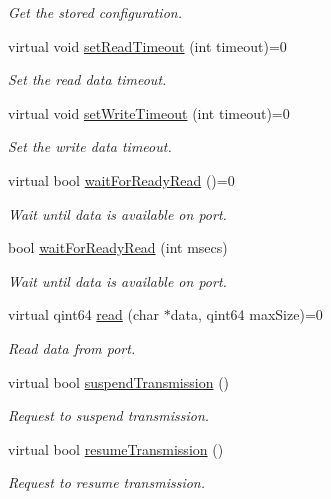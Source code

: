 \begin{DoxyCompactItemize}
\begin{DoxyCompactList}\small\item\em Get the stored configuration. \end{DoxyCompactList}\item 
virtual void \hyperlink{classmdt_abstract_port_a6589b04467e0073d18ba872201bdcd84}{setReadTimeout} (int timeout)=0
\begin{DoxyCompactList}\small\item\em Set the read data timeout. \end{DoxyCompactList}\item 
virtual void \hyperlink{classmdt_abstract_port_a12eb422d52ebb09a650f8497b258c2e7}{setWriteTimeout} (int timeout)=0
\begin{DoxyCompactList}\small\item\em Set the write data timeout. \end{DoxyCompactList}\item 
virtual bool \hyperlink{classmdt_abstract_port_a848e3c86aa6ec480e8c471655fbcf5c5}{waitForReadyRead} ()=0
\begin{DoxyCompactList}\small\item\em Wait until data is available on port. \end{DoxyCompactList}\item 
bool \hyperlink{classmdt_abstract_port_ae77785fbad938eac5f24f437e7683277}{waitForReadyRead} (int msecs)
\begin{DoxyCompactList}\small\item\em Wait until data is available on port. \end{DoxyCompactList}\item 
virtual qint64 \hyperlink{classmdt_abstract_port_a9d9c45220d5328c9856a2445557fe970}{read} (char $\ast$data, qint64 maxSize)=0
\begin{DoxyCompactList}\small\item\em Read data from port. \end{DoxyCompactList}\item 
virtual bool \hyperlink{classmdt_abstract_port_aff3d79248baf96e670eba6d2fef700b9}{suspendTransmission} ()
\begin{DoxyCompactList}\small\item\em Request to suspend transmission. \end{DoxyCompactList}\item 
virtual bool \hyperlink{classmdt_abstract_port_ad4a04c995df881593db0a309000be7a7}{resumeTransmission} ()
\begin{DoxyCompactList}\small\item\em Request to resume transmission. \end{DoxyCompactList}\item 

\end{DoxyCompactItemize}
